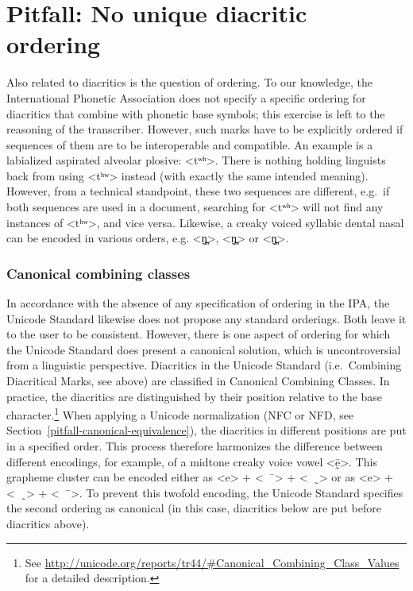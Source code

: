 \section{Pitfall: No unique diacritic ordering}
\label{pitfall-no-unique-diacritic-ordering}

Also related to diacritics is the question of ordering. To our knowledge, the
International Phonetic Association does not specify a specific ordering for
diacritics that combine with phonetic base symbols; this exercise is left to the
reasoning of the transcriber. However, such marks have to be explicitly ordered
if sequences of them are to be interoperable and compatible. An example is a
labialized aspirated alveolar plosive: <tʷʰ>. There is nothing holding linguists
back from using <tʰʷ> instead (with exactly the same intended meaning). However,
from a technical standpoint, these two sequences are different, e.g.~if both
sequences are used in a document, searching for <tʷʰ> will not find any
instances of <tʰʷ>, and vice versa. Likewise, a creaky voiced syllabic dental
nasal can be encoded in various orders, e.g. <n̪̰̩>, <n̩̰̪> or <n̩̪̰>.

\subsubsection*{Canonical combining classes}

In accordance with the absence of any specification of ordering in the IPA, the
Unicode Standard likewise does not propose any standard orderings. Both leave it
to the user to be consistent. However, there is one aspect of ordering for which
the Unicode Standard does present a canonical solution, which is uncontroversial
from a linguistic perspective. Diacritics in the Unicode Standard
(i.e.~Combining Diacritical Marks, see above) are classified in Canonical
Combining Classes. In practice, the diacritics are distinguished by their
position relative to the base character.\footnote{See
\url{http://unicode.org/reports/tr44/\#Canonical\_Combining\_Class\_Values} for a
detailed description.} When applying a Unicode normalization (NFC or NFD, see
Section~\ref{pitfall-canonical-equivalence}), the diacritics in different
positions are put in a specified order. This process therefore harmonizes the
difference between different encodings, for example, of a midtone creaky voice
vowel <ḛ̄>. This grapheme cluster can be encoded either as <e> + <\ \ ̄> + <\ \
̰> or as <e> + <\ \ ̰> + <\ \ ̄>. To prevent this twofold encoding, the Unicode
Standard specifies the second ordering as canonical (in this case, diacritics
below are put before diacritics above).

